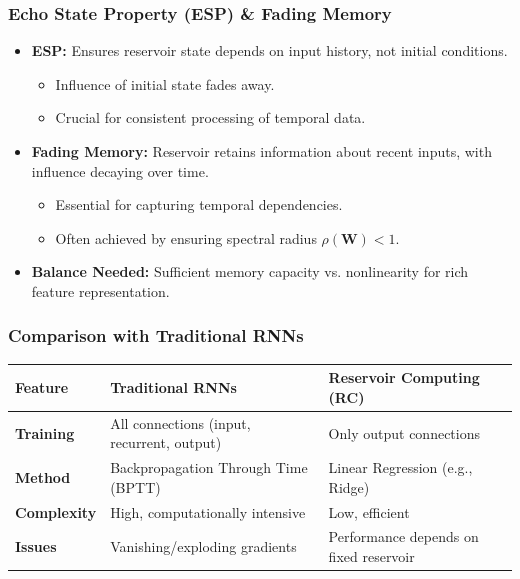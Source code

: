 \documentclass{beamer}
\begin{document}
\begin{frame}
    \frametitle{Echo State Property (ESP) & Fading Memory}
    \begin{itemize}
        \item \textbf{ESP:} Ensures reservoir state depends on input history, not initial conditions.
            \begin{itemize}
                \item Influence of initial state fades away.
                \item Crucial for consistent processing of temporal data.
            \end{itemize}
        \pause
        \item \textbf{Fading Memory:} Reservoir retains information about recent inputs, with influence decaying over time.
            \begin{itemize}
                \item Essential for capturing temporal dependencies.
                \item Often achieved by ensuring spectral radius $\rho(\mathbf{W}) < 1$.
            \end{itemize}
        \pause
        \item \textbf{Balance Needed:} Sufficient memory capacity vs. nonlinearity for rich feature representation.
    \end{itemize}
\end{frame}

\begin{frame}
    \frametitle{Comparison with Traditional RNNs}
    \begin{tabular}{lp{5cm}p{5cm}}
        \toprule
        Feature & \textbf{Traditional RNNs} & \textbf{Reservoir Computing (RC)} \\
        \midrule
        \textbf{Training} & All connections (input, recurrent, output) & Only output connections \\
        \textbf{Method} & Backpropagation Through Time (BPTT) & Linear Regression (e.g., Ridge) \\
        \textbf{Complexity} & High, computationally intensive & Low, efficient \\
        \textbf{Issues} & Vanishing/exploding gradients & Performance depends on fixed reservoir \\
        \bottomrule
    \end{tabular}
\end{frame}
\end{document}
